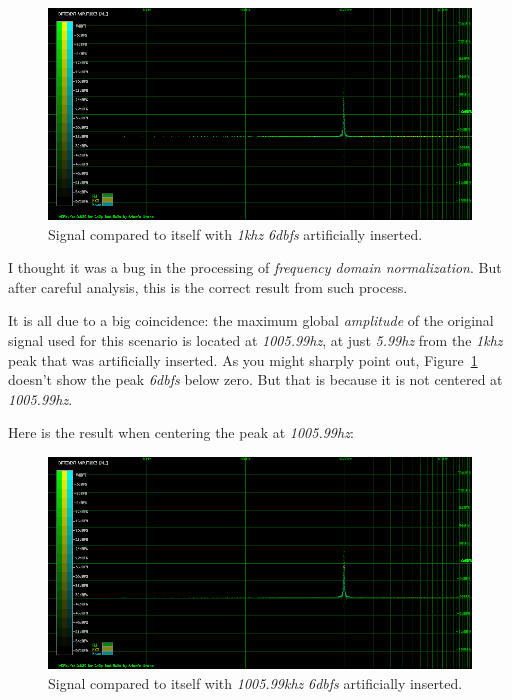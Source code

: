 \documentclass[10pt,a4paper]{report}
\newcommand{\hz}[1]{\textit{\mbox{#1\acrshort{hz}}}}
\newcommand{\khz}[1]{\textit{\mbox{#1\acrshort{khz}}}}
\newcommand{\db}[1]{\textit{\mbox{#1\acrshort{dbfs}}}}
\begin{document}
\begin{appendices}
\begin{figure}[H]
	\centering
	\includegraphics[width=1.0\linewidth]{images/corner/plot1.png}
	\caption[Corner Case 1]{Signal compared to itself with \khz{1} \db{6} artificially inserted.}
	\label{fig:corner1}
\end{figure}

I thought it was a bug in the processing of \textit{frequency domain normalization}. But after careful analysis, this is the correct result from such process.

It is all due to a big coincidence: the maximum global \textit{amplitude} of the original signal used for this scenario is located at \hz{1005.99}, at just \hz{5.99} from the \khz{1} peak that was artificially inserted. As you might sharply point out, Figure~\ref{fig:corner1} doesn't show the peak \db{6} below zero. But that is because it is not centered at \hz{1005.99}. 

Here is the result when centering the peak at \hz{1005.99}:

\begin{figure}[H]
\centering
\includegraphics[width=1.0\linewidth]{images/corner/plot2.png}
\caption[Corner Case 2]{Signal compared to itself with \khz{1005.99} \db{6} artificially inserted.}
\label{fig:corner2}
\end{figure}


\end{appendices}
\end{document}
